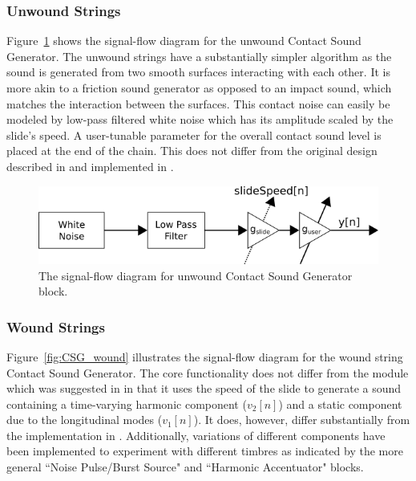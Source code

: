 \documentclass[../main.tex]{subfiles}
\begin{document}
\subsubsection{Unwound Strings}
Figure~\ref{fig:CSG_unwound} shows the signal-flow diagram for the unwound Contact Sound Generator. The unwound strings have a substantially simpler algorithm as the sound is generated from two smooth surfaces interacting with each other. It is more akin to a friction sound generator as opposed to an impact sound, which matches the interaction between the surfaces. This contact noise can easily be modeled by low-pass filtered white noise which has its amplitude scaled by the slide's speed. A user-tunable parameter for the overall contact sound level is placed at the end of the chain. This does not differ from the original design described in  and implemented in .

\begin{figure}[h]
    \centering
    \includegraphics[scale=.5]{./images/diagrams/CSG_unwound.png}
    \caption{The signal-flow diagram for unwound Contact Sound Generator block.}
    \label{fig:CSG_unwound}
\end{figure}

\subsubsection{Wound Strings}
\label{subsec:WoundString}
Figure~\ref{fig:CSG_wound} illustrates the signal-flow diagram for the wound string Contact Sound Generator. The core functionality does not differ from the module which was suggested in  in that it uses the speed of the slide to generate a sound containing a time-varying harmonic component ($v_2[n]$) and a static component due to the longitudinal modes ($v_1[n]$). It does, however,  differ substantially from the implementation in . Additionally, variations of different components have been implemented to experiment with different timbres as indicated by the more general ``Noise Pulse/Burst Source" and ``Harmonic Accentuator" blocks.
\end{document}

